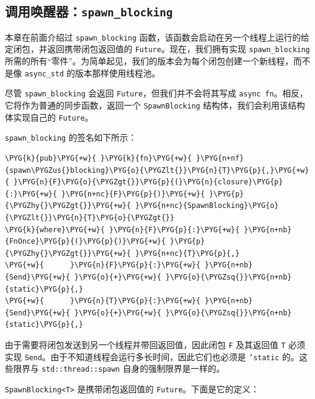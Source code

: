 \subsection{调用唤醒器：\texttt{spawn\_blocking}}

本章在前面介绍过 \texttt{spawn\_blocking} 函数，该函数会启动在另一个线程上运行的给定闭包，并返回携带闭包返回值的 \texttt{Future}。现在，我们拥有实现 \texttt{spawn\_blocking} 所需的所有“零件”。为简单起见，我们的版本会为每个闭包创建一个新线程，而不是像 \texttt{async\_std} 的版本那样使用线程池。

尽管 \texttt{spawn\_blocking} 会返回 \texttt{Future}，但我们并不会将其写成 \texttt{async fn}。相反，它将作为普通的同步函数，返回一个 \texttt{SpawnBlocking} 结构体，我们会利用该结构体实现自己的 \texttt{Future}。

\texttt{spawn\_blocking} 的签名如下所示：

\begin{Verbatim}[commandchars=\\\{\},breaklines=true,breakanywhere=true,fontsize=\codefont,xleftmargin=17bp]
\PYG{k}{pub}\PYG{+w}{ }\PYG{k}{fn}\PYG{+w}{ }\PYG{n+nf}{spawn\PYGZus{}blocking}\PYG{o}{\PYGZlt{}}\PYG{n}{T}\PYG{p}{,}\PYG{+w}{ }\PYG{n}{F}\PYG{o}{\PYGZgt{}}\PYG{p}{(}\PYG{n}{closure}\PYG{p}{:}\PYG{+w}{ }\PYG{n+nc}{F}\PYG{p}{)}\PYG{+w}{ }\PYG{p}{\PYGZhy{}\PYGZgt{}}\PYG{+w}{ }\PYG{n+nc}{SpawnBlocking}\PYG{o}{\PYGZlt{}}\PYG{n}{T}\PYG{o}{\PYGZgt{}}
\PYG{k}{where}\PYG{+w}{ }\PYG{n}{F}\PYG{p}{:}\PYG{+w}{ }\PYG{n+nb}{FnOnce}\PYG{p}{(}\PYG{p}{)}\PYG{+w}{ }\PYG{p}{\PYGZhy{}\PYGZgt{}}\PYG{+w}{ }\PYG{n+nc}{T}\PYG{p}{,}
\PYG{+w}{      }\PYG{n}{F}\PYG{p}{:}\PYG{+w}{ }\PYG{n+nb}{Send}\PYG{+w}{ }\PYG{o}{+}\PYG{+w}{ }\PYG{o}{\PYGZsq{}}\PYG{n+nb}{static}\PYG{p}{,}
\PYG{+w}{      }\PYG{n}{T}\PYG{p}{:}\PYG{+w}{ }\PYG{n+nb}{Send}\PYG{+w}{ }\PYG{o}{+}\PYG{+w}{ }\PYG{o}{\PYGZsq{}}\PYG{n+nb}{static}\PYG{p}{,}
\end{Verbatim}

由于需要将闭包发送到另一个线程并带回返回值，因此闭包 \texttt{F} 及其返回值 \texttt{T} 必须实现 \texttt{Send}。由于不知道线程会运行多长时间，因此它们也必须是 \texttt{'static} 的。这些限界与 \texttt{std::thread::spawn} 自身的强制限界是一样的。

\texttt{SpawnBlocking<T>} 是携带闭包返回值的 \texttt{Future}。下面是它的定义：

